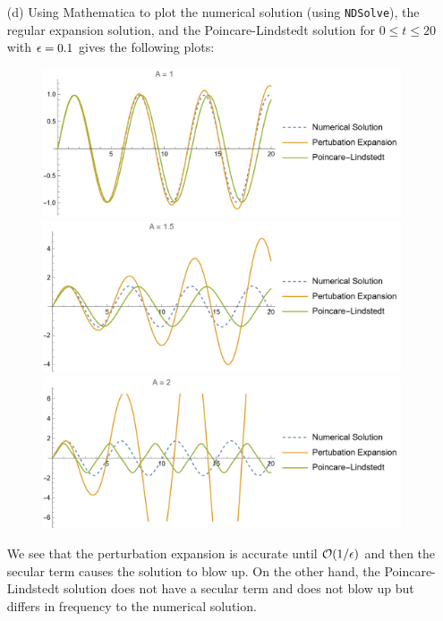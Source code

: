 \documentclass[12pt]{report}
\begin{document}
\begin{solution}
\begin{enumerate}
        \item [(d)]
        Using Mathematica to plot the numerical solution (using \verb+NDSolve+), the regular expansion solution, and
        the Poincare-Lindstedt solution for $0 \leq t \leq 20$ with ${\epsilon} = 0.1$ gives the following plots:
        \begin{figure}[H]
            \center
            \includegraphics[width=.8\textwidth]{plots/1d.png}
            \includegraphics[width=.8\textwidth]{plots/1d1.png}
            \includegraphics[width=.8\textwidth]{plots/1d2.png}
        \end{figure}
        We see that the perturbation expansion is accurate until ${\mathcal{O}}(1/{\epsilon})$ and then the secular term causes the solution to blow up. On the other hand, the Poincare-Lindstedt solution does not have a secular term and does not blow up but differs in frequency to the numerical solution. 

    \end{enumerate}
\end{solution}

\newpage
\end{document}
